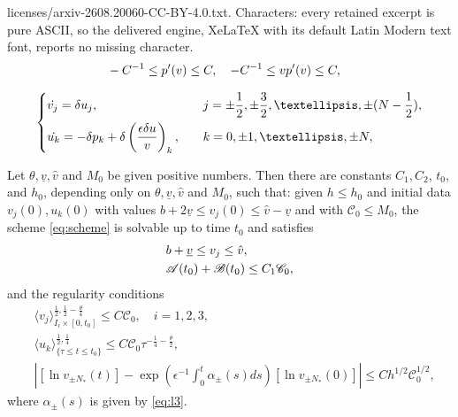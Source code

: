 \documentclass[10pt,a4paper]{amsart}
\begin{document}
licenses/arxiv-2608.20060-CC-BY-4.0.txt. Characters: every retained excerpt is pure ASCII, so the delivered engine, XeLaTeX with its default Latin Modern text font, reports no missing character.
\begin{equation}\label{eq:vvv}
\begin{aligned}
\displaystyle & -C^{-1}\leq p'(v)\leq C,\quad %
-C^{-1}\leq vp'(v)\leq C,
\end{aligned}	
\end{equation}

\begin{equation}\label{eq:scheme}\left\{
\begin{aligned} 
\displaystyle  &\dot{v_j}=\delta u_j,&&\quad j=\pm \frac12,\pm \frac32,\dots,\pm(N-\frac12),\\
&\dot{u_k}=-\delta p_k+\delta\left(\frac{\epsilon \delta u}{v} \right)_k, &&\quad k=0,\pm 1,\dots,\pm N,
\end{aligned}\right.
\end{equation}

\begin{lemma}\label{thm-exsit2}
Let \(\theta, \underline{v}, \hat{v}\) and \(M_{0}\) be given positive numbers. Then there are constants \(C_1, C_2\), \(t_{0}\), and \(h_0\), depending only on $\theta, \underline{v},\hat v$ and $M_{0}$, such that: given \(h\leq h_{0}\) and initial data \(v_{j}(0), u_{k}(0)\) with values \(b+2\underline{v}\leq v_{j}( 0)\leq \hat v-\underline{v}\)
and with \(\mathscr{C} _{0}\leq M_{0}\), the scheme \eqref{eq:scheme} is solvable up to time \(t_0\) and satisfies
\begin{align}
\displaystyle  &b+\underline{v}\leq v_{j}\leq \hat v, \label{local-01} \\
&\mathscr{A}(t_0)+\mathscr{B}(t_0)\leq C_1\mathscr{C}_0, \label{local-02} %
\end{align}
and the regularity conditions
\begin{align}
&\langle v_{j}\rangle_{I_i\times[0,t_{0}]}^{\frac{1}{2},\frac{1}{2}-\frac{\theta}{4}}\leq C\mathscr{C}_{0},\quad i=1,2,3, \label{local-04}\\
&\langle u_k\rangle_{\{\tau\leq t\leq t_0\}}^{\frac{1}{2},\frac{1}{4}}\leq C\mathscr{C}_0\tau^{-\frac{1}{4}-\frac{\theta}{2}},\label{local-06}\\
&\left|\left[\ln v_{\pm N_* }(t)\right]-\exp\left(\epsilon^{-1}\int_{0}^{t}\alpha_{\pm}(s)ds\right)\left[\ln v_{\pm N_* }(0)\right]\right|\leq Ch^{1/2}\mathscr{C}_0^{1/2},\label{local-07}
\end{align}
where \(\alpha_{\pm}(s)\) is given by \eqref{eq:l3}.
\end{lemma}
\end{document}
